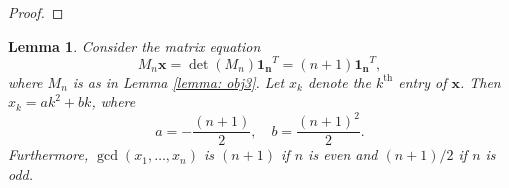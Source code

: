 \documentclass[11pt,reqno]{amsart}
\theoremstyle{definition}
\theoremstyle{plain}
\newtheorem{lemma}[mydef]{Lemma}
\begin{document}
\begin{proof}


\end{proof}

\begin{lemma}\label{lemma: M_nCremer}
Consider the matrix equation 
\begin{equation*}
M_n \mathbf{x} 
= \det(M_n) \mathbf{1_n}^T
= (n+1) \mathbf{1_n}^T,
\end{equation*}
where $M_n$ is as in Lemma \ref{lemma: obj3}. 
Let $x_k$ denote the $k^{\textrm{th}}$ entry of $\mathbf{x}$. Then $x_k = a k^2 + b k$, where
\[
a = -\frac{(n+1)}{2}, \quad b = \frac{(n+1)^2}{2}.
\]
Furthermore, $\gcd(x_1,\dots, x_n)$ is $(n+1)$ if $n$ is even and $(n+1)/2$ if $n$ is odd. 
\end{lemma}
\end{document}
